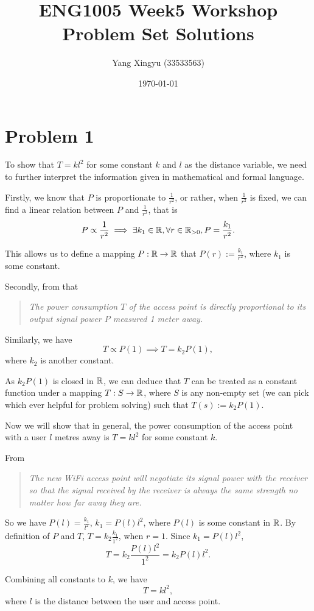 \documentclass[12pt,a4paper]{article}
\begin{document}
\title{ENG1005 Week5 Workshop Problem Set Solutions}
\author{Yang Xingyu (33533563)}
\date{\today}
\maketitle

\section*{Problem 1}
\begin{solution}
To show that $T=kl^2$ for some constant $k$ and $l$ as the distance variable, we need to further interpret the information given in mathematical and formal language.

Firstly, we know that $P$ is proportionate to $\frac{1}{r^2}$, or rather, when $\frac{1}{r^2}$ is fixed, we can find a linear relation between $P$ and $\frac{1}{r^2}$, that is
\[
P \propto \frac{1}{r^2} \implies \exists k_1 \in \mathbb{R}, \forall r\in \mathbb{R}_{> 0}, P = \frac{k_1}{r^2}.
\]

This allows us to define a mapping $P: \mathbb{R} \to \mathbb{R}$ that $P(r) := \frac{k_1}{r^2}$, where $k_1$ is some constant.

Secondly, from that
\begin{quote}
\textit{The power consumption $T$ of the access point is directly proportional to its output signal power $P$ measured 1 meter away.}
\end{quote}
Similarly, we have 
\[
T \propto P(1) \implies T = k_2 P(1),
\]
where $k_2$ is another constant. 

As $k_2P(1)$ is closed in $\mathbb{R}$, we can deduce that $T$ can be treated as a constant function under a mapping $T: S \to \mathbb{R}$, where $S$ is any non-empty set (we can pick which ever helpful for problem solving) such that $T(s) := k_2P(1)$.

Now we will show that in general, the power consumption of the access point with a user $l$ metres away is $T = kl^2$
for some constant $k$.

From 
\begin{quote}
\textit{The new WiFi access point will negotiate its signal power with the receiver so that the signal
received by the receiver is always the same strength no matter how far away they are.}
\end{quote}
So we have $P(l) = \frac{k_1}{l^2}$, $k_1 = P(l)l^2$, where $P(l)$ is some constant in $\mathbb{R}$. By definition of $P$ and $T$, $T = k_2\frac{k_1}{1^2}$, when $r=1$. Since $k_1 = P(l)l^2$, 
\[
T = k_2\frac{P(l)l^2}{1^2} = k_2P(l)l^2.
\]

Combining all constants to $k$, we have
\[
T = kl^2,
\]
where $l$ is the distance between the user and access point.
\end{solution}
\end{document}

